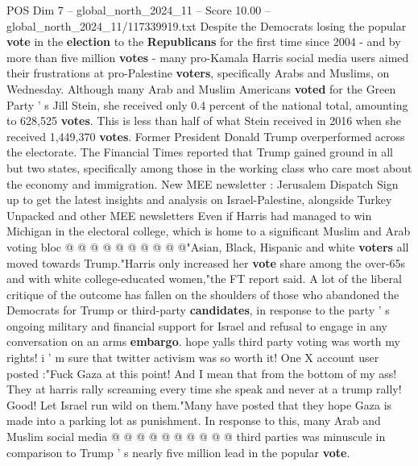 \begin{textsample}{POS Dim 7 – global\_north\_2024\_11 – Score 10.00 – global\_north\_2024\_11/117339919.txt}  \label{ex:f7_pos_117}
Despite the Democrats losing the popular \textbf{vote} in the \textbf{election} to the \textbf{Republicans} for the first time since 2004 - and by more than five million \textbf{votes} - many pro-Kamala Harris social media users aimed their frustrations at pro-Palestine \textbf{voters}, specifically Arabs and Muslims, on Wednesday.
Although many Arab and Muslim Americans \textbf{voted} for the Green Party ' s Jill Stein, she received only 0.4 percent of the national total, amounting to 628,525 \textbf{votes}.
This is less than half of what Stein received in 2016 when she received 1,449,370 \textbf{votes}.
Former President Donald Trump overperformed across the electorate.
The Financial Times reported that Trump gained ground in all but two states, specifically among those in the working class who care most about the economy and immigration.
New MEE newsletter : Jerusalem Dispatch Sign up to get the latest insights and analysis on Israel-Palestine, alongside Turkey Unpacked and other MEE newsletters Even if Harris had managed to win Michigan in the electoral college, which is home to a significant Muslim and Arab voting bloc @ @ @ @ @ @ @ @ @ @"Asian, Black, Hispanic and white \textbf{voters} all moved towards Trump."Harris only increased her \textbf{vote} share among the over-65s and with white college-educated women,"the FT report said.
A lot of the liberal critique of the outcome has fallen on the shoulders of those who abandoned the Democrats for Trump or third-party \textbf{candidates}, in response to the party ' s ongoing military and financial support for Israel and refusal to engage in any conversation on an arms \textbf{embargo}. hope yalls third party voting was worth my rights! i ' m sure that twitter activism was so worth it!
One X account user posted :"Fuck Gaza at this point!
And I mean that from the bottom of my ass!
They at harris rally screaming every time she speak and never at a trump rally!
Good!
Let Israel run wild on them."Many have posted that they hope Gaza is made into a parking lot as punishment.
In response to this, many Arab and Muslim social media @ @ @ @ @ @ @ @ @ @ third parties was minuscule in comparison to Trump ' s nearly five million lead in the popular \textbf{vote}.

\end{textsample}
